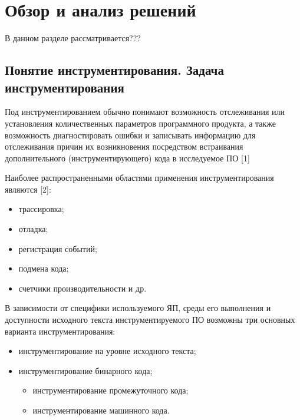 \chapter{Обзор и анализ решений}

В данном разделе рассматривается???

\section{Понятие инструментирования. Задача инструментирования}

Под инструментированием обычно понимают возможность отслеживания или установления количественных параметров программного продукта, а также возможность диагностировать ошибки и записывать информацию для отслеживания причин их возникновения посредством встраивания дополнительного (инструментирующего) кода в исследуемое ПО [1]

Наиболее распространенными областями применения инструментирования являются [2]:

\begin{itemize}
  \item трассировка;
  \item отладка;
  \item регистрация событий;
  \item подмена кода;
  \item счетчики производительности и др.
\end{itemize}

В зависимости от специфики используемого ЯП, среды его выполнения и доступности исходного текста инструментируемого ПО возможны три основных варианта инструментирования:

\begin{itemize}
  \item инструментирование на уровне исходного текста;
  \item инструментирование бинарного кода;
  \begin{itemize}
    \item инструментирование промежуточного кода;
    \item инструментирование машинного кода.
  \end{itemize}
\end{itemize}

